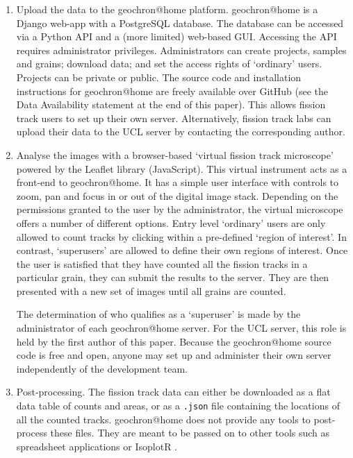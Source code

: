 \documentclass[gchron, manuscript]{copernicus}
\begin{document}
\begin{enumerate}
\item Upload the data to the geochron@home platform. geochron@home is
  a Django web-app with a PostgreSQL database.  The database can be
  accessed via a Python API and a (more limited) web-based
  GUI. Accessing the API requires administrator
  privileges. Administrators can create projects, samples and grains;
  download data; and set the access rights of `ordinary' users.
  Projects can be private or public. The source code and installation
  instructions for geochron@home are freely available over GitHub (see
  the Data Availability statement at the end of this paper). This
  allows fission track users to set up their own
  server. Alternatively, fission track labs can upload their data to
  the UCL server by contacting the corresponding author.

\item Analyse the images with a browser-based `virtual fission track
  microscope' powered by the Leaflet library (JavaScript). This
  virtual instrument acts as a front-end to geochron@home. It has a
  simple user interface with controls to zoom, pan and focus in or out
  of the digital image stack. Depending on the permissions granted to
  the user by the administrator, the virtual microscope offers a
  number of different options.  Entry level `ordinary' users are only
  allowed to count tracks by clicking within a pre-defined `region of
  interest'. In contrast, `superusers' are allowed to define their own
  regions of interest. Once the user is satisfied that they have
  counted all the fission tracks in a particular grain, they can
  submit the results to the server. They are then presented with a new
  set of images until all grains are counted.

  The determination of who qualifies as a `superuser' is made by the
  administrator of each geochron@home server. For the UCL server, this
  role is held by the first author of this paper. Because the
  geochron@home source code is free and open, anyone may set up and
  administer their own server independently of the development team.

\item Post-processing. The fission track data can either be downloaded
  as a flat data table of counts and areas, or as a \texttt{.json}
  file containing the locations of all the counted
  tracks. geochron@home does not provide any tools to post-process
  these files. They are meant to be passed on to other tools such as
  spreadsheet applications or IsoplotR \citep{vermeesch2018c}.
  
\end{enumerate}
  
\end{document}
